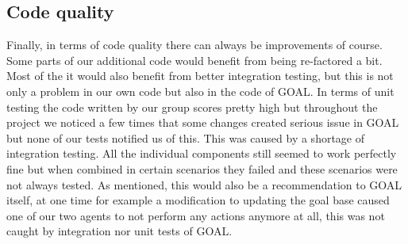 \documentclass[11pt]{article}
\begin{document}
\subsection{Code quality}
Finally, in terms of code quality there can always be improvements of course. Some parts of our additional code would benefit from being re-factored a bit. Most of the it would also benefit from better integration testing, but this is not only a problem in our own code but also in the code of GOAL. In terms of unit testing the code written by our group scores pretty high but throughout the project we noticed a few times that some changes created serious issue in GOAL but none of our tests notified us of this. This was caused by a shortage of integration testing. All the individual components still seemed to work perfectly fine but when combined in certain scenarios they failed and these scenarios were not always tested. As mentioned, this would also be a recommendation to GOAL itself, at one time for example a modification to updating the goal base caused one of our two agents to not perform any actions anymore at all, this was not caught by integration nor unit tests of GOAL.

\clearpage
\end{document}
